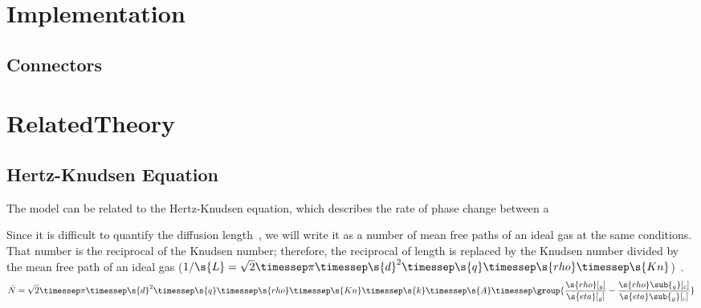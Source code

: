 \section{Implementation}

\subsection{Connectors}





\section{RelatedTheory}
\subsection{Hertz-Knudsen Equation}
\label{sec:HertzKnudsen}

The model can be related to the Hertz-Knudsen equation, which describes the rate of phase change between a


Since it is difficult to quantify the diffusion length~, we will write it as a number of mean free paths of an ideal gas at the same conditions.  That number is the reciprocal of the Knudsen number; therefore, the reciprocal of length is replaced by the Knudsen number divided by the mean free path of an ideal gas ($1/\s{L} = \sqrt{2}\timessep\pi\timessep\s{d}^2\timessep\s{q}\timessep\s{rho}\timessep\s{Kn}$)~\cite{Cussler1997}.
\begin{equation}
  \dot{N} = \sqrt{2}\timessep\pi\timessep\s{d}^2\timessep\s{q}\timessep\s{rho}\timessep\s{Kn}\timessep\s{k}\timessep\s{A}\timessep\group{\frac{\s{rho}[_g]}{\s{eta}[_g]} - \frac{\s{rho}\sub{_g}[_c]}{\s{eta}\sub{_g}[_c]}}
\end{equation}

